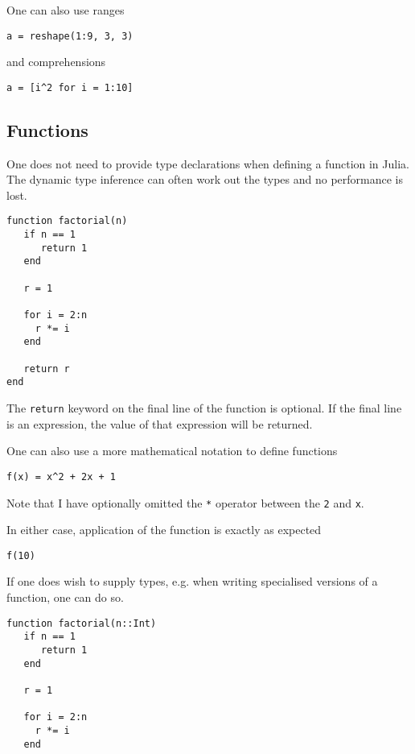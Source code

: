 \documentclass[a4paper,10pt]{article}
\newcommand{\code}{\lstinline}
\begin{document}
{One can also use ranges

\begin{lstlisting}
a = reshape(1:9, 3, 3)
\end{lstlisting}

and comprehensions

\begin{lstlisting}
a = [i^2 for i = 1:10]
\end{lstlisting}

\subsection{Functions}

One does not need to provide type declarations when defining a function in Julia. The dynamic
type inference can often work out the types and no performance is lost.

\begin{lstlisting}
function factorial(n)
   if n == 1
      return 1
   end

   r = 1
   
   for i = 2:n
     r *= i
   end

   return r  
end
\end{lstlisting}

The \code{return} keyword on the final line of the function is optional. If the final line is 
an expression, the value of that expression will be returned.

One can also use a more mathematical notation to define functions

\begin{lstlisting}
f(x) = x^2 + 2x + 1
\end{lstlisting}

Note that I have optionally omitted the \code{*} operator between the \code{2} and \code{x}.

In either case, application of the function is exactly as expected

\begin{lstlisting}
f(10)
\end{lstlisting}

If one does wish to supply types, e.g. when writing specialised versions of a function, one
can do so.

\begin{lstlisting}
function factorial(n::Int)
   if n == 1
      return 1
   end

   r = 1
   
   for i = 2:n
     r *= i
   end


\end{lstlisting}}
\end{document}
